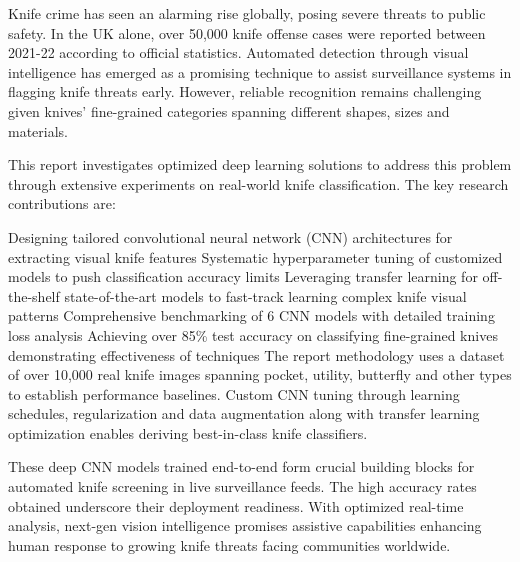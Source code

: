 \documentclass[10pt,twocolumn,letterpaper]{article}
\begin{document}
Knife crime has seen an alarming rise globally, posing severe threats to public safety. In the UK alone, over 50,000 knife offense cases were reported between 2021-22 according to official statistics. Automated detection through visual intelligence has emerged as a promising technique to assist surveillance systems in flagging knife threats early. However, reliable recognition remains challenging given knives' fine-grained categories spanning different shapes, sizes and materials.

This report investigates optimized deep learning solutions to address this problem through extensive experiments on real-world knife classification. The key research contributions are:

Designing tailored convolutional neural network (CNN) architectures \cite{oshea2015introduction} for extracting visual knife features
Systematic hyperparameter tuning of customized models to push classification accuracy limits
Leveraging transfer learning for off-the-shelf state-of-the-art models to fast-track learning complex knife visual patterns
Comprehensive benchmarking of 6 CNN models with detailed training loss analysis
Achieving over 85\% test accuracy on classifying fine-grained knives demonstrating effectiveness of techniques
The report methodology uses a dataset of over 10,000 real knife images spanning pocket, utility, butterfly and other types to establish performance baselines. Custom CNN tuning through learning schedules, regularization and data augmentation along with transfer learning optimization enables deriving best-in-class knife classifiers.

These deep CNN models trained end-to-end form crucial building blocks for automated knife screening in live surveillance feeds. The high accuracy rates obtained underscore their deployment readiness. With optimized real-time analysis, next-gen vision intelligence promises assistive capabilities enhancing human response to growing knife threats facing communities worldwide.


\end{document}
